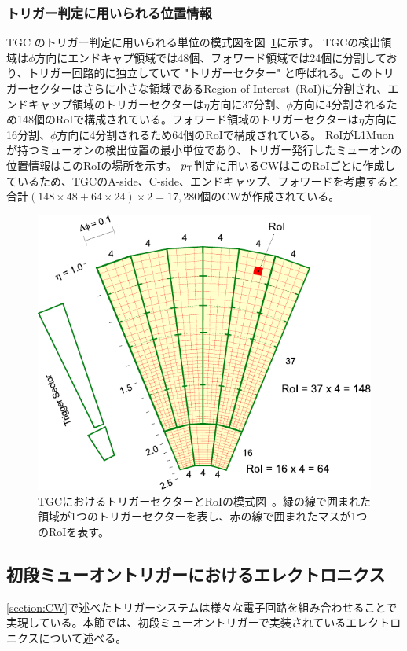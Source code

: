 \subsubsection{トリガー判定に用いられる位置情報}
TGC のトリガー判定に用いられる単位の模式図を図~\ref{fig:RoI}に示す。
TGCの検出領域は$\phi$方向にエンドキャプ領域では48個、フォワード領域では24個に分割しており、トリガー回路的に独立していて "トリガーセクター" と呼ばれる。このトリガーセクターはさらに小さな領域であるRegion of Interest~(RoI)に分割され、エンドキャップ領域のトリガーセクターは$\eta$方向に37分割、$\phi$方向に4分割されるため148個のRoIで構成されている。フォワード領域のトリガーセクターは$\eta$方向に16分割、$\phi$方向に4分割されるため64個のRoIで構成されている。
RoIがL1Muonが持つミューオンの検出位置の最小単位であり、トリガー発行したミューオンの位置情報はこのRoIの場所を示す。
$p_{\rm{T}}$判定に用いるCWはこのRoIごとに作成しているため、TGCのA-side、C-side、エンドキャップ、フォワードを考慮すると合計$(148\times48+64\times24)\times2=17,280$個のCWが作成されている。

\begin{figure}[tb]
  \centering
  \includegraphics[clip, width=12cm]{fig/3/RoI.pdf}
  \caption{TGCにおけるトリガーセクターとRoIの模式図~\cite{article:phase1}。緑の線で囲まれた領域が1つのトリガーセクターを表し、赤の線で囲まれたマスが1つのRoIを表す。}
  \label{fig:RoI}
\end{figure}



\newpage
\subsection{初段ミューオントリガーにおけるエレクトロニクス}
\ref{section:CW}で述べたトリガーシステムは様々な電子回路を組み合わせることで実現している。本節では、初段ミューオントリガーで実装されているエレクトロニクスについて述べる。

